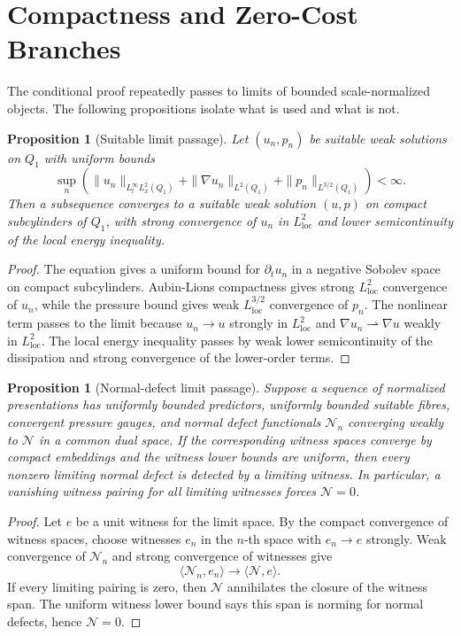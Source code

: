 \documentclass[11pt]{article}
\newtheorem{proposition}[theorem]{Proposition}
\begin{document}
\section{Compactness and Zero-Cost Branches}

The conditional proof repeatedly passes to limits of bounded scale-normalized
objects.  The following propositions isolate what is used and what is not.

\begin{proposition}[Suitable limit passage]
Let \((u_n,p_n)\) be suitable weak solutions on \(Q_1\) with uniform bounds
\[
\sup_n
\left(
\|u_n\|_{L^\infty_tL^2_x(Q_1)}
+\|\nabla u_n\|_{L^2(Q_1)}
+\|p_n\|_{L^{3/2}(Q_1)}
\right)<\infty.
\]
Then a subsequence converges to a suitable weak solution \((u,p)\) on compact
subcylinders of \(Q_1\), with strong convergence of \(u_n\) in \(L^2_{\mathrm{loc}}\)
and lower semicontinuity of the local energy inequality.
\end{proposition}

\begin{proof}
The equation gives a uniform bound for \(\partial_tu_n\) in a negative Sobolev
space on compact subcylinders.  Aubin-Lions compactness gives strong
\(L^2_{\mathrm{loc}}\) convergence of \(u_n\), while the pressure bound gives weak
\(L^{3/2}_{\mathrm{loc}}\) convergence of \(p_n\).  The nonlinear term passes to
the limit because \(u_n\to u\) strongly in \(L^2_{\mathrm{loc}}\) and
\(\nabla u_n\rightharpoonup \nabla u\) weakly in \(L^2_{\mathrm{loc}}\).  The
local energy inequality passes by weak lower semicontinuity of the dissipation
and strong convergence of the lower-order terms.
\end{proof}

\begin{proposition}[Normal-defect limit passage]
Suppose a sequence of normalized presentations has uniformly bounded predictors,
uniformly bounded suitable fibres, convergent pressure gauges, and normal defect
functionals \(\mathcal N_n\) converging weakly to \(\mathcal N\) in a common dual
space.  If the corresponding witness spaces converge by compact embeddings and
the witness lower bounds are uniform, then every nonzero limiting normal defect
is detected by a limiting witness.  In particular, a vanishing witness pairing
for all limiting witnesses forces \(\mathcal N=0\).
\end{proposition}

\begin{proof}
Let \(e\) be a unit witness for the limit space.  By the compact convergence of
witness spaces, choose witnesses \(e_n\) in the \(n\)-th space with \(e_n\to e\)
strongly.  Weak convergence of \(\mathcal N_n\) and strong convergence of
witnesses give
\[
\langle \mathcal N_n,e_n\rangle\to \langle \mathcal N,e\rangle.
\]
If every limiting pairing is zero, then \(\mathcal N\) annihilates the closure of
the witness span.  The uniform witness lower bound says this span is norming for
normal defects, hence \(\mathcal N=0\).
\end{proof}
\end{document}
